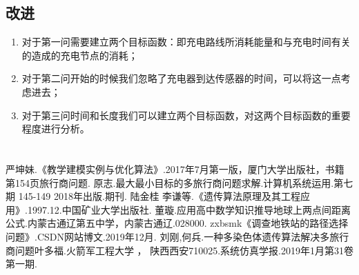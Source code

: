 \documentclass{article}
\renewcommand{\baselinestretch}{1.5}
\begin{document}
\subsection{改进}
\begin{enumerate}[(1)] 
    \item 对于第一问需要建立两个目标函数：即充电路线所消耗能量和与充电时间有关的造成的充电节点的消耗；
    \item 对于第二问开始的时候我们忽略了充电器到达传感器的时间，可以将这一点考虑进去；
    \item 对于第三问时间和长度我们可以建立两个目标函数，对这两个目标函数的重要程度进行分析。
\end{enumerate}
\newpage
\section*{}
\renewcommand{\baselinestretch}{0.01}                       %
\begin{thebibliography}{99}                                 %
    严坤妹.《教学建模实例与优化算法》.2017年7月第一版，厦门大学出版社，书籍第154页旅行商问题.
    原志.最大最小目标的多旅行商问题求解.计算机系统运用.第七期 145-149 2018年出版.期刊.
    陆金桂\; 李谦等.《遗传算法原理及其工程应用》.1997.12.中国矿业大学出版社.
    董璇.应用高中数学知识推导地球上两点间距离公式.内蒙古通辽第五中学，内蒙古通辽.028000.
    zxbsmk《调查地铁站的路径选择问题》.CSDN网站博文.2019年12月.
    刘刚,何兵.一种多染色体遗传算法解决多旅行商问题叶多福.火箭军工程大学 ， 陕西西安710025.系统仿真学报.2019年1月第31卷第一期.
\end{thebibliography}
\thispagestyle{empty}
\newpage
   
\end{document}
